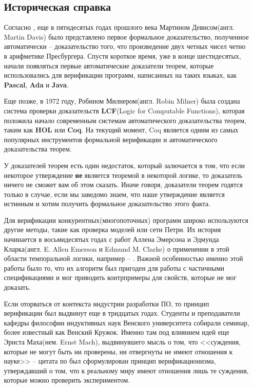 \subsection{Историческая справка}

Согласно \cite{omodeo2017martin}, еще в пятидесятых годах прошлого века Мартином Девисом(англ. Martin Davis) было представлено первое формальное доказательство, полученное автоматически -- доказательство того, что произведение двух четных чисел четно в арифметике Пресбургера. Спустя короткое время, уже в конце шестидесятых, начали появляться первые автоматические доказатели теорем, которые использовались для верификации программ, написанных на таких языках, как \textbf{Pascal}, \textbf{Ada} и \textbf{Java}.

Еще позже, в 1972 году, Робином Милнером(англ. Robin Milner) была создана система проверки доказательств \textbf{LCF}(Logic for Computable Functions), которая положила начало современным системам автоматического доказательства теорем, таким как \textbf{HOL} или \textbf{Coq}. На текущий момент, Coq является одним из самых популярных инструментов формальной верификации и автоматического доказательства теорем.

У доказателей теорем есть один недостаток, который залючается в том, что если некоторое утверждение \textbf{не} является теоремой в некоторой логике, то доказатель ничего не сможет вам об этом сказать. Иначе говоря, доказатели теорем годятся только в случае, если мы заведомо знаем, что наше утверждение является истинным и хотим получить формальное доказательство этого факта.

Для верификации конкурентных(многопоточных) программ широко используются другие методы, такие как проверка моделей или сети Петри. Их история начинается в восьмидесятых годах с работ Аллена Эмерсона и Эдмунда Кларка(англ. E. Allen Emerson и Edmund M. Clarke) о применении в этой области темпоральной логики, например -- \cite{Clarke:1981:DSS:648063.747438}. Важной особенностью именно этой работы было то, что их алгоритм был пригоден для работы с частичными спецификациями и мог приводить контрпримеры для свойств, которые не мог доказать.

Если оторваться от контекста индустрии разработки ПО, то принцип верификации был выдвинут еще в тридцатых годах. Студенты и преподаватели кафедры философии индуктивных наук Венского университета собирали семинар, более известный как Венский Кружок. Именно там под влиянием идей еще Эрнста Маха(нем. Ernst Mach), выдвинувшего мысль о том, что <<суждения, которые не могут быть ни проверены, ни отвергнуты не имеют отношения к науке>> -- цитата по \cite{wiki:mach} был сформулирован принцип верификационизма, утверждавший о том, что к реальному миру имеют отношения лишь те суждения, которые можно проверить экспериментом.
